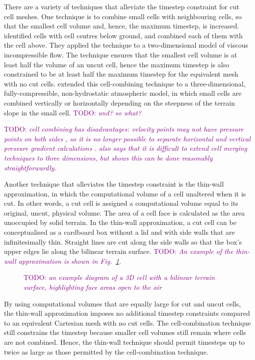 \documentclass{article}
\newcommand{\TODO}[1]{\textcolor{purple}{TODO: \emph{#1}}}
\begin{document}
There are a variety of techniques that alleviate the timestep constraint for cut cell meshes.  One technique is to combine small cells with neighbouring cells, so that the smallest cell volume and, hence, the maximum timestep, is increased.  \citet{ye1999} identified cells with cell centres below ground, and combined each of them with the cell above.  They applied the technique to a two-dimensional model of viscous incompressible flow.  The technique ensures that the smallest cell volume is at least half the volume of an uncut cell, hence the maximum timestep is also constrained to be at least half the maximum timestep for the equivalent mesh with no cut cells.
\citet{yamazaki2016} extended this cell-combining technique to a three-dimensional, fully-compressible, non-hydrostatic atmospheric model, in which small cells are combined vertically or horizontally depending on the steepness of the terrain slope in the small cell.  \TODO{and? so what?}

\TODO{cell combining has disadvantages: velocity points may not have pressure points on both sides \citep{kirkpatrick2003}, so it is no longer possible to separate horizontal and vertical pressure gradient calculations \citep{walko-avissar2008b}.  \citet{kirkpatrick2003} also says that it is difficult to extend cell merging techniques to three dimensions, but \citet{yamazaki2016} shows this can be done reasonably straightforwardly.}

Another technique that alleviates the timestep constraint is the thin-wall approximation, in which the computational volume of a cell unaltered when it is cut.  In other words, a cut cell is assigned a computational volume equal to its original, uncut, physical volume.  The area of a cell face is calculated as the area unoccupied by solid terrain.  In the thin-wall approximation, a cut cell can be conceptualised as a cardboard box without a lid and with side walls that are infinitesimally thin.  Straight lines are cut along the side walls so that the box's upper edges lie along the bilinear terrain surface.  \TODO{An example of the thin-wall approximation is shown in Fig.~\ref{fig:thin-wall}.}

\begin{figure}
	\caption{\TODO{an example diagram of a 3D cell with a bilinear terrain surface, highlighting face areas open to the air}}
	\label{fig:thin-wall}
\end{figure}

By using computational volumes that are equally large for cut and uncut cells, the thin-wall approximation imposes no additional timestep constraints compared to an equivalent Cartesian mesh with no cut cells.  The cell-combination technique still constrains the timestep because smaller cell volumes still remain where cells are not combined.  Hence, the thin-wall technique should permit timesteps up to twice as large as those permitted by the cell-combination technique.
\end{document}
